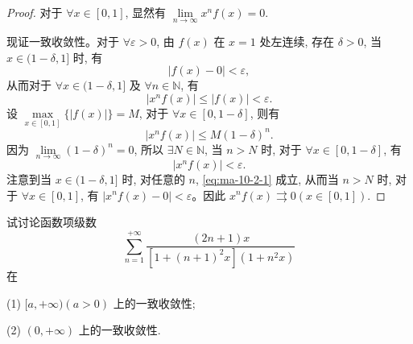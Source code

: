 \begin{proof}
对于 $\forall x\in[0,1]$, 显然有 $\lim\limits_{n\to\infty}x^nf(x)=0$.

现证一致收敛性。对于 $\forall\varepsilon>0$, 由 $f(x)$ 在 $x=1$ 处左连续, 存在 $\delta>0$, 当 $x\in(1-\delta,1]$ 时, 有
\[
  |f(x)-0|<\varepsilon,
\]
从而对于 $\forall x\in(1-\delta,1]$ 及 $\forall n\in\mathbb N$, 有
\begin{equation}
  |x^nf(x)|\leq |f(x)|<\varepsilon.
  \label{eq:ma-10-2-1}
\end{equation}
设 $\max\limits_{x\in[0,1]}\{|f(x)|\}=M$, 对于 $\forall x\in[0,1-\delta]$, 则有
\[
  |x^nf(x)|\leq M(1-\delta)^n.
\]
因为 $\lim\limits_{n\to\infty}(1-\delta)^n=0$, 所以 $\exists N\in\mathbb N$, 当 $n>N$ 时, 对于 $\forall x\in[0,1-\delta]$, 有
\[
  |x^nf(x)|<\varepsilon.
\]
注意到当 $x\in(1-\delta,1]$ 时, 对任意的 $n$, \eqref{eq:ma-10-2-1} 成立, 从而当 $n>N$ 时, 对于 $\forall x\in[0,1]$, 有 $|x^nf(x)-0|<\varepsilon$。因此 $x^nf(x)\rightrightarrows0(x\in[0,1])$.
\end{proof}


\begin{example}\label{example:ma-10-2-3}
试讨论函数项级数
\[
  \sum_{n=1}^{+\infty}\frac{(2n+1)x}{[1+(n+1)^2x](1+n^2x)}
\]
在

(1) $[a,+\infty)(a>0)$ 上的一致收敛性;

(2) $(0,+\infty)$ 上的一致收敛性.
\end{example}


